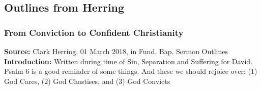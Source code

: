 \subsection{Outlines from Herring}

\subsubsection{From Conviction to Confident Christianity}
\textbf{Source: } Clark Herring, 01 March 2018, in Fund. Bap. Sermon Outlines\\
\textbf{Introduction: } Written during time of Sin, Separation and Suffering for David. Psalm 6 is a good reminder of some things. And these we should rejoice over: (1) God Cares, (2) God Chastises, and (3) God Convicts



